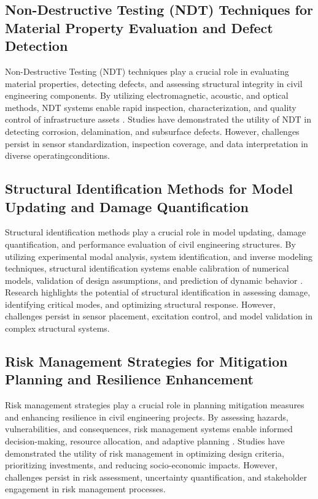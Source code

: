 \documentclass[journal, a4paper]{IEEEtran}
\begin{document}
\subsection{Non-Destructive Testing (NDT) Techniques for Material Property Evaluation and Defect Detection}
Non-Destructive Testing (NDT) techniques play a crucial role in evaluating material properties, detecting defects,
and assessing structural integrity in civil engineering components. By utilizing electromagnetic, acoustic, and
optical methods, NDT systems enable rapid inspection, characterization, and quality control of infrastructure assets
\cite{li_physics-informed_2023} \cite{han_crack_2021} \cite{bevan_automated_2022}. Studies have demonstrated the utility of NDT in detecting corrosion, delamination, and subsurface defects.
However, challenges persist in sensor standardization, inspection coverage,
and data interpretation in diverse operatingconditions.

\subsection{Structural Identification Methods for Model Updating and Damage Quantification}
Structural identification methods play a crucial role in model updating, damage quantification, and performance evaluation of
civil engineering structures. By utilizing experimental modal analysis, system identification, and inverse modeling techniques,
structural identification systems enable calibration of numerical models, validation of design assumptions, and prediction of
dynamic behavior \cite{zhang_defect_2020} \cite{wang_fatigue_2023} \cite{yifei_structure_2023}. Research highlights the potential of structural identification in assessing damage,
identifying critical modes, and optimizing structural response. However, challenges persist in sensor placement,
excitation control, and model validation in complex structural systems.

\subsection{Risk Management Strategies for Mitigation Planning and Resilience Enhancement}
Risk management strategies play a crucial role in planning mitigation measures and enhancing resilience in civil
engineering projects. By assessing hazards, vulnerabilities, and consequences, risk management systems enable informed 
decision-making, resource allocation, and adaptive planning \cite{zima_damage_2021} \cite{han_crack_2021} \cite{bevan_automated_2022}.
Studies have demonstrated the utility of risk management in optimizing design criteria,
prioritizing investments, and reducing socio-economic impacts. However, challenges persist in risk assessment,
uncertainty quantification, and stakeholder engagement in risk management processes.
\end{document}
